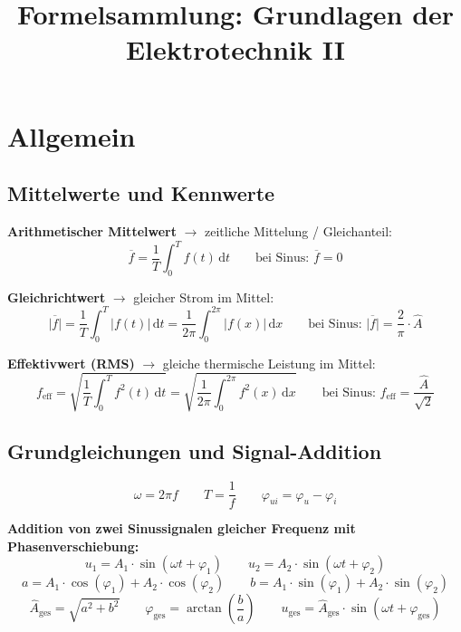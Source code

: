 \documentclass[a4paper,11pt]{article}
\title{\textbf{Formelsammlung: Grundlagen der Elektrotechnik II}}
\author{}
\date{}
\begin{document}
\maketitle

\section{Allgemein}

\subsection*{Mittelwerte und Kennwerte}

\textbf{Arithmetischer Mittelwert} $\rightarrow$ zeitliche Mittelung / Gleichanteil:
\[ \overline{f} = \frac{1}{T} \int_{0}^{T} f(t) \, \mathrm{d}t \qquad \text{bei Sinus: } \overline{f} = 0 \]

\textbf{Gleichrichtwert} $\rightarrow$ gleicher Strom im Mittel:
\[ \overline{|f|} = \frac{1}{T} \int_{0}^{T} |f(t)| \, \mathrm{d}t = \frac{1}{2\pi} \int_{0}^{2\pi} |f(x)| \, \mathrm{d}x \qquad \text{bei Sinus: } \overline{|f|} = \frac{2}{\pi} \cdot \hat{A} \]

\textbf{Effektivwert (RMS)} $\rightarrow$ gleiche thermische Leistung im Mittel:
\[ f_{\text{eff}} = \sqrt{\frac{1}{T} \int_{0}^{T} f^2(t) \, \mathrm{d}t} = \sqrt{\frac{1}{2\pi} \int_{0}^{2\pi} f^2(x) \, \mathrm{d}x} \qquad \text{bei Sinus: } f_{\text{eff}} = \frac{\hat{A}}{\sqrt{2}} \]

\subsection*{Grundgleichungen und Signal-Addition}
\[ \omega = 2\pi f \qquad T = \frac{1}{f} \qquad \varphi_{ui} = \varphi_u - \varphi_i \]

\textbf{Addition von zwei Sinussignalen gleicher Frequenz mit Phasenverschiebung:}
\[ u_1 = A_1 \cdot \sin(\omega t + \varphi_1) \qquad u_2 = A_2 \cdot \sin(\omega t + \varphi_2) \]
\[ a = A_1 \cdot \cos(\varphi_1) + A_2 \cdot \cos(\varphi_2) \qquad b = A_1 \cdot \sin(\varphi_1) + A_2 \cdot \sin(\varphi_2) \]
\[ \hat{A}_{\text{ges}} = \sqrt{a^2 + b^2} \qquad \varphi_{\text{ges}} = \arctan\left(\frac{b}{a}\right) \qquad u_{\text{ges}} = \hat{A}_{\text{ges}} \cdot \sin(\omega t + \varphi_{\text{ges}}) \]
\end{document}
